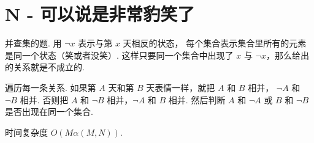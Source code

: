 \documentclass{ctexart}
\begin{document}
\section*{N - 可以说是非常豹笑了}

并查集的题. 用 $\neg{}x$ 表示与第 $x$ 天相反的状态，
每个集合表示集合里所有的元素是同一个状态（笑或者没笑）.
这样只要同一个集合中出现了 $x$ 与 $\neg{}x$，那么给出的关系就是不成立的.

遍历每一条关系.
如果第 $A$ 天和第 $B$ 天表情一样，就把 $A$ 和 $B$ 相并， $\neg{}A$ 和 $\neg{}B$ 相并.
否则把 $A$ 和 $\neg{}B$ 相并，$\neg{}A$ 和 $B$ 相并.
然后判断 $A$ 和 $\neg{}A$ 或 $B$ 和 $\neg{}B$ 是否出现在同一个集合.

时间复杂度 $O(M\alpha(M,N))$.
\end{document}
